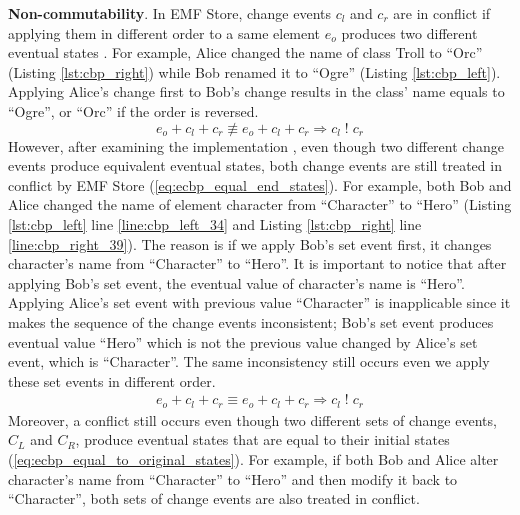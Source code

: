 \textbf{Non-commutability}. In EMF Store, change events $c_{l}$ and $c_{r}$ are in conflict if applying them in different order to a same element $e_{o}$ produces two different eventual states \cite{koegel2010operation}. For example, Alice changed the \textsf{name} of class \textsf{Troll} to ``Orc'' (Listing \ref{lst:cbp_right}) while Bob renamed it to ``Ogre'' (Listing \ref{lst:cbp_left}). Applying Alice's change first to Bob's change results in the class' \textsf{name} equals to ``Ogre'', or ``Orc'' if the order is reversed.
\begin{equation} \label{eq:change_noncommutability}
e_{o} + c_{l} + c_{r} \not\equiv e_{o} + c_{l} + c_{r} \Rightarrow c_{l}\;!\;c_{r}
\end{equation}  
However, after examining the implementation \cite{eclipse2019emfstore}, even though two different change events produce equivalent eventual states, both change events are still treated in conflict by EMF Store (\ref{eq:ecbp_equal_end_states}). For example, both Bob and Alice changed the \textsf{name} of element \textsf{character} from ``Character'' to ``Hero'' (Listing \ref{lst:cbp_left} line \ref{line:cbp_left_34} and Listing \ref{lst:cbp_right} line \ref{line:cbp_right_39}). The reason is if we apply Bob's set event first, it changes \textsf{character}'s \textsf{name} from ``Character'' to ``Hero''. It is important to notice that after applying Bob's set event, the eventual value of \textsf{character}'s \textsf{name} is ``Hero''. Applying Alice's set event with previous value ``Character'' is inapplicable since it makes the sequence of the change events inconsistent; Bob's set event produces eventual value ``Hero'' which is not the previous value changed by Alice's set event, which is ``Character''. The same inconsistency still occurs even we apply these set events in different order.
\begin{equation} \label{eq:ecbp_equal_end_states}
\begin{split}
e_{o} + c_{l} + c_{r} \equiv e_{o} + c_{l} + c_{r} \Rightarrow c_{l}\;!\;c_{r}
\end{split}
\end{equation} 
Moreover, a conflict still occurs even though two different sets of change events, $C_{L}$ and $C_{R}$, produce eventual states that are equal to their initial states (\ref{eq:ecbp_equal_to_original_states}). For example, if both Bob and Alice alter \textsf{character}'s \textsf{name} from ``Character'' to ``Hero'' and then modify it back to ``Character'', both sets of change events are also treated in conflict.
